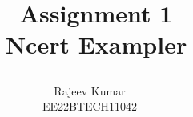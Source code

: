 \documentclass[journal,12pt,twocolumn]{IEEEtran}
\theoremstyle{remark}
\begin{document}
%




\vspace{3cm}

\title{
\Huge\ Assignment 1\\
\Huge\ Ncert Exampler\\
\large\author{Rajeev Kumar \\EE22BTECH11042}
	
}	


%
%
%

% 
%



% 
\end{document}
